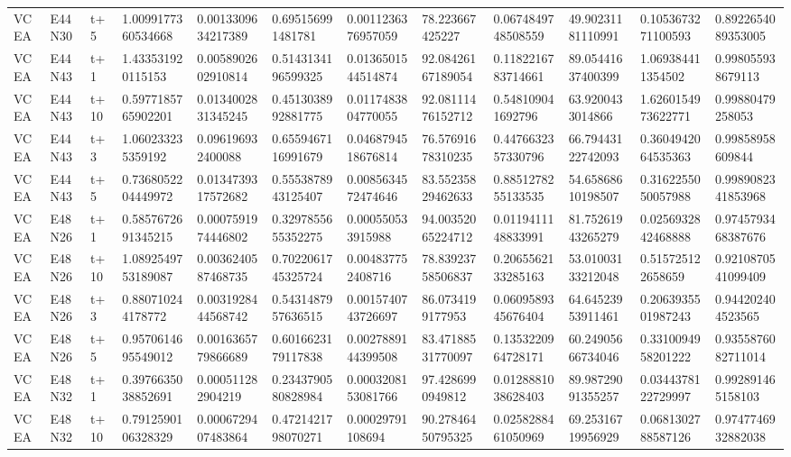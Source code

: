 \begin{landscape}
\begin{longtable}{llllllllllll}
VCEA & E44N30 & t+5 & 1.0099177360534668 & 0.0013309634217389 & 0.695156991481781 & 0.0011236376957059 & 78.223667425227 & 0.0674849748508559 & 49.90231181110991 & 0.1053673271100593 & 0.8922654089353005 \\
VCEA & E44N43 & t+1 & 1.433531920115153 & 0.0058902602910814 & 0.5143134196599325 & 0.0136501544514874 & 92.08426167189054 & 0.1182216783714661 & 89.05441637400399 & 1.069384411354502 & 0.998055938679113 \\
VCEA & E44N43 & t+10 & 0.5977185765902201 & 0.0134002831345245 & 0.4513038992881775 & 0.0117483804770055 & 92.08111476152712 & 0.548109041692796 & 63.9200433014866 & 1.6260154973622771 & 0.99880479258053 \\
VCEA & E44N43 & t+3 & 1.060233235359192 & 0.096196932400088 & 0.6559467116991679 & 0.0468794518676814 & 76.57691678310235 & 0.4476632357330796 & 66.79443122742093 & 0.3604942064535363 & 0.99858958609844 \\
VCEA & E44N43 & t+5 & 0.7368052204449972 & 0.0134739317572682 & 0.5553878943125407 & 0.0085634572474646 & 83.55235829462633 & 0.8851278255133535 & 54.65868610198507 & 0.3162255050057988 & 0.9989082341853968 \\
VCEA & E48N26 & t+1 & 0.5857672691345215 & 0.0007591974446802 & 0.3297855655352275 & 0.000550533915988 & 94.00352065224712 & 0.0119411148833991 & 81.75261943265279 & 0.0256932842468888 & 0.9745793468387676 \\
VCEA & E48N26 & t+10 & 1.0892549753189087 & 0.0036240587468735 & 0.7022061745325724 & 0.004837752408716 & 78.83923758506837 & 0.2065562133285163 & 53.01003133212048 & 0.515725122658659 & 0.9210870541099409 \\
VCEA & E48N26 & t+3 & 0.880710244178772 & 0.0031928444568742 & 0.5431487957636515 & 0.0015740743726697 & 86.0734199177953 & 0.0609589345676404 & 64.64523953911461 & 0.2063935501987243 & 0.944202404523565 \\
VCEA & E48N26 & t+5 & 0.9570614695549012 & 0.0016365779866689 & 0.6016623179117838 & 0.0027889144399508 & 83.47188531770097 & 0.1353220964728171 & 60.24905666734046 & 0.3310094958201222 & 0.9355876082711014 \\
VCEA & E48N32 & t+1 & 0.3976635038852691 & 0.000511282904219 & 0.2343790580828984 & 0.0003208153081766 & 97.4286990949812 & 0.0128881038628403 & 89.98729091355257 & 0.0344378122729997 & 0.992891465158103 \\
VCEA & E48N32 & t+10 & 0.7912590106328329 & 0.0006729407483864 & 0.4721421798070271 & 0.00029791108694 & 90.27846450795325 & 0.0258288461050969 & 69.25316719956929 & 0.0681302788587126 & 0.9747746932882038 \\

\end{longtable}
\end{landscape}
